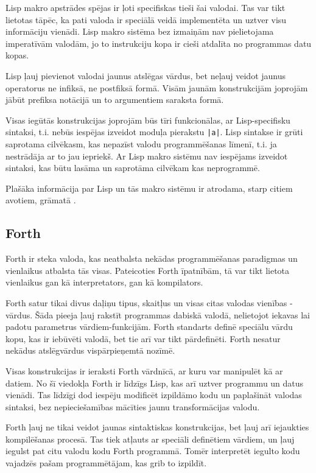 Lisp makro apstrādes spējas ir ļoti specifiskas tieši šai valodai. Tas var tikt lietotas tāpēc, ka pati valoda ir speciālā veidā implementēta un uztver visu informāciju vienādi. Lisp makro sistēma bez izmaiņām nav pielietojama imperatīvām valodām, jo to instrukciju kopa ir cieši atdalīta no programmas datu kopas.

Lisp ļauj pievienot valodai jaunus atslēgas vārdus, bet neļauj veidot jaunus operatorus ne infiksā, ne postfiksā formā. Visām jaunām konstrukcijām joprojām jābūt prefiksa notācijā un to argumentiem saraksta formā.

Visas iegūtās konstrukcijas joprojām būs tīri funkcionālas, ar Lisp-specifisku sintaksi, t.i. nebūs iespējas izveidot moduļa pierakstu \verb/|a|/. Lisp sintakse ir grūti saprotama cilvēkasm, kas nepazīst valodu programmēšanas līmenī, t.i. ja nestrādāja ar to jau iepriekš. Ar Lisp makro sistēmu nav iespējams izveidot sintaksi, kas būtu lasāma un saprotāma cilvēkam kas neprogrammē.

Plašāka informācija par Lisp un tās makro sistēmu ir atrodama, starp citiem avotiem, grāmatā \cite{Seibel:PracticalCommonLisp}.

\subsection{\label{sbs:rel_forth}Forth}

Forth ir steka valoda, kas neatbalsta nekādas programmēšanas paradigmas un vienlaikus atbalsta tās visas. Pateicoties Forth īpatnībām, tā var tikt lietota vienlaikus gan kā interpretators, gan kā kompilators.

Forth satur tikai divus daļiņu tipus, skaitļus un visas citas valodas vienības - vārdus. Šāda pieeja ļauj rakstīt programmas dabiskā valodā, nelietojot iekavas lai padotu parametrus vārdiem-funkcijām. Forth standarts definē speciālu vārdu kopu, kas ir iebūvēti valodā, bet tie arī var tikt pārdefinēti. Forth nesatur nekādus atslēgvārdus vispārpieņemtā nozīmē.

Visas konstrukcijas ir ieraksti Forth vārdnīcā, ar kuru var manipulēt kā ar datiem. No šī viedokļa Forth ir līdzīgs Lisp, kas arī uztver programmu un datus vienādi. Tas līdzīgi dod iespēju modificēt izpildāmo kodu un paplašināt valodas sintaksi, bez nepieciešamības mācīties jaunu transformācijas valodu.

Forth ļauj ne tikai veidot jaunas sintaktiskas konstrukcijas, bet ļauj arī iejaukties kompilēšanas procesā. Tas tiek atļauts ar speciāli definētiem vārdiem, un ļauj iegulst pat citu valodu kodu Forth programmā. Tomēr interpretēt iegulto kodu vajadzēs pašam programmētājam, kas grib to izpildīt.

